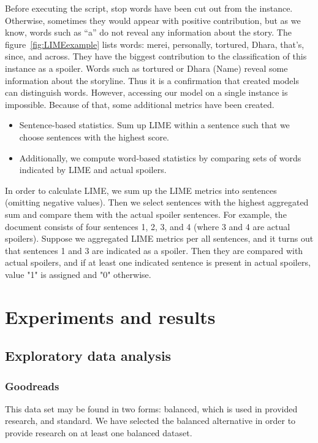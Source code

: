 \documentclass[11pt]{article}
\begin{document}
Before executing the script, stop words have been cut out from the instance. Otherwise, sometimes they would appear with positive contribution, but as we know, words such as “a” do not reveal any information about the story. The figure~\ref{fig:LIMEexample} lists words: merei, personally, tortured, Dhara, that's, since, and across. They have the biggest contribution to the classification of this instance as a spoiler. Words such as tortured or Dhara (Name) reveal some information about the storyline. Thus it is a confirmation that created models can distinguish words. However, accessing our model on a single instance is impossible. Because of that, some additional metrics have been created.
\begin{itemize}
    \item Sentence-based statistics. Sum up LIME within a sentence such that we choose sentences with the highest score.
    \item Additionally, we compute word-based statistics by comparing sets of words indicated by LIME and actual spoilers.
\end{itemize}

In order to calculate LIME, we sum up the LIME metrics into sentences (omitting negative values). Then we select sentences with the highest aggregated sum and compare them with the actual spoiler sentences. For example, the document consists of four sentences 1, 2, 3, and 4 (where 3 and 4 are actual spoilers). Suppose we aggregated LIME metrics per all sentences, and it turns out that sentences 1 and 3 are indicated as a spoiler. Then they are compared with actual spoilers, and if at least one indicated sentence is present in actual spoilers, value "1" is assigned and "0" otherwise. 


\section{Experiments and results} \label{experiments}
\subsection{Exploratory data analysis} \label{eda}


\subsubsection*{Goodreads}
This data set may be found in two forms: balanced, which is used in provided research, and standard. We have selected the balanced alternative in order to provide research on at least one balanced dataset.
\end{document}
